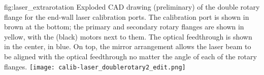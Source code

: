 \begin{dunefigure}{fig:laser_extrarotation}
{Exploded CAD drawing (preliminary) of the double rotary flange for the end-wall laser calibration ports. The calibration port is shown in brown at the bottom; the primary and secondary rotary flanges are shown in yellow,  with the (black) motors next to them. The optical feedthrough is shown in the center, in blue. On top, the mirror arrangement allows the laser beam to be aligned with the optical feedthrough no matter the angle of each of the rotary flanges.}
\texttt{[image: calib-laser\_doublerotary2\_edit.png]}
\end{dunefigure}

